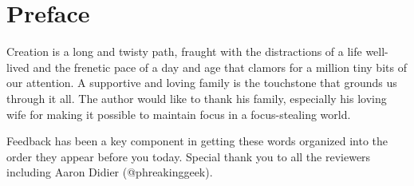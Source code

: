 \chapter*{Preface}
\vspace{5mm}

\justify
Creation is a long and twisty path, fraught with the distractions of a life well-lived and the frenetic pace of a day and age that clamors for a million tiny bits of our attention. A supportive and loving family is the touchstone that grounds us through it all. The author would like to thank his family, especially his loving wife for making it possible to maintain focus in a focus-stealing world.

\justify
Feedback has been a key component in getting these words organized into the order they appear before you today. Special thank you to all the reviewers including Aaron Didier (@phreakinggeek).
